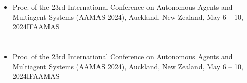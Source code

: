\begin{center}
	\begin{itemize}
		\item {}
			{Proc. of the 23rd International Conference on Autonomous Agents and Multiagent Systems (AAMAS 2024), Auckland, New Zealand, May 6 – 10, 2024}{IFAAMAS}
	\end{itemize}
	

	\section{}

	\begin{itemize}
		\item {}
			{Proc. of the 23rd International Conference on Autonomous Agents and Multiagent Systems (AAMAS 2024), Auckland, New Zealand, May 6 – 10, 2024}{IFAAMAS}
	\end{itemize}


	\section{}


\end{center}

